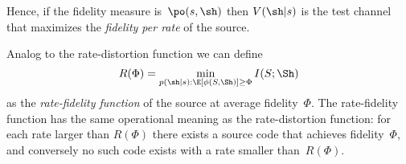 Hence, if the fidelity measure is~$\po(s,\sh)$ then $V(\sh|s)$ is the test
channel that maximizes the \emph{fidelity per rate} of the source.

Analog to the rate-distortion function we can define 
\[ R(\Phi) = \min_{p(\sh|s): \E[\phi(S,\Sh)] \ge \Phi} I(S;\Sh) \]
as the \emph{rate-fidelity function} of the source at average fidelity~$\Phi$.
The rate-fidelity function has the same operational meaning as the
rate-distortion function: for each rate larger than $R(\Phi)$ there exists a
source code that achieves fidelity~$\Phi$, and
conversely no such code exists with a rate smaller than~$R(\Phi)$.



